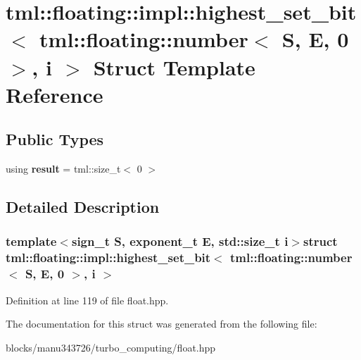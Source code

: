 \hypertarget{structtml_1_1floating_1_1impl_1_1highest__set__bit_3_01tml_1_1floating_1_1number_3_01_s_00_01_e_00_010_01_4_00_01i_01_4}{\section{tml\+:\+:floating\+:\+:impl\+:\+:highest\+\_\+set\+\_\+bit$<$ tml\+:\+:floating\+:\+:number$<$ S, E, 0 $>$, i $>$ Struct Template Reference}
\label{structtml_1_1floating_1_1impl_1_1highest__set__bit_3_01tml_1_1floating_1_1number_3_01_s_00_01_e_00_010_01_4_00_01i_01_4}
}
\subsection*{Public Types}
\begin{DoxyCompactItemize}
\item 
\hypertarget{structtml_1_1floating_1_1impl_1_1highest__set__bit_3_01tml_1_1floating_1_1number_3_01_s_00_01_e_00_010_01_4_00_01i_01_4_acfc27ac7c291fbc6dda7bc8b0b198e45}{using {\bfseries result} = tml\+::size\+\_\+t$<$ 0 $>$}\label{structtml_1_1floating_1_1impl_1_1highest__set__bit_3_01tml_1_1floating_1_1number_3_01_s_00_01_e_00_010_01_4_00_01i_01_4_acfc27ac7c291fbc6dda7bc8b0b198e45}

\end{DoxyCompactItemize}


\subsection{Detailed Description}
\subsubsection*{template$<$sign\+\_\+t S, exponent\+\_\+t E, std\+::size\+\_\+t i$>$struct tml\+::floating\+::impl\+::highest\+\_\+set\+\_\+bit$<$ tml\+::floating\+::number$<$ S, E, 0 $>$, i $>$}



Definition at line 119 of file float.\+hpp.



The documentation for this struct was generated from the following file\+:\begin{DoxyCompactItemize}
\item 
blocks/manu343726/turbo\+\_\+computing/float.\+hpp\end{DoxyCompactItemize}
